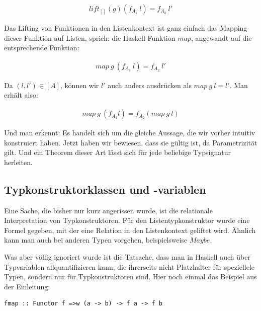 \begin{align}
lift_{[]}(g) (f_{A_1}\ l) = f_{A_2}\ l'
\end{align}

Das Lifting von Funktionen in den Listenkontext ist ganz einfach das Mapping dieser Funktion auf Listen, sprich: die Haskell-Funktion
$map$, angewandt auf die entsprechende Funktion:

\begin{align}
map\ g\ (f_{A_1}\ l) = f_{A_2}\ l'
\end{align}

Da $(l, l') \in [A]$, können wir $l'$ auch anders ausdrücken als $map\ g\ l = l'$. Man erhält also:

\begin{align}
map\ g\ (f_{A_1} l) = f_{A_2} (map\ g\ l)
\end{align}

Und man erkennt: Es handelt sich um die gleiche Aussage, die wir vorher intuitiv konstruiert haben. Jetzt haben wir bewiesen,
dass sie gültig ist, da Parametrizität gilt. Und ein Theorem dieser Art lässt sich für jede beliebige Typsignatur herleiten.


\subsection{Typkonstruktorklassen und -variablen}

Eine Sache, die bisher nur kurz angerissen wurde, ist die relationale Interpretation von Typkonstruktoren.
Für den Listentypkonstruktor wurde eine Formel gegeben, mit der eine Relation in den Listenkontext geliftet wird.
Ähnlich kann man auch bei anderen Typen vorgehen, beispielsweise $Maybe$.

Was aber völlig ignoriert wurde ist die Tatsache, dass man in Haskell auch über Typvariablen allquantifizieren kann, die ihrerseits
nicht Platzhalter für speziellele Typen, sondern nur für Typkonstruktoren sind. Hier noch einmal das Beispiel aus der Einleitung:

\begin{verbatim}
fmap :: Functor f =>w (a -> b) -> f a -> f b
\end{verbatim}

